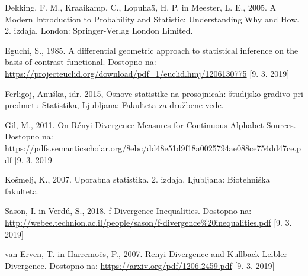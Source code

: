 \documentclass[a4paper, 12pt]{article}
\theoremstyle{definition}
\begin{document}
\begin{thebibliography}{9}
	
Dekking, F. M., Kraaikamp, C., Lopuha{\"a}, H. P. in Meester, L. E., 2005. A Modern Introduction to Probability and Statistic: Understanding Why and How. 2. izdaja. London: Springer-Verlag London Limited.

Eguchi, S., 1985. A differential geometric approach to statistical inference on the basis of contrast functional. Dostopno na: \url{https://projecteuclid.org/download/pdf_1/euclid.hmj/1206130775} [9. 3. 2019]

Ferligoj, Anu\v{s}ka, idr. 2015, Osnove statistike na prosojnicah: \v{s}tudijsko gradivo pri predmetu Statistika, Ljubljana: Fakulteta za dru\v{z}bene vede.

Gil, M., 2011. On Rényi Divergence Measures for Continuous Alphabet Sources. Dostopno na: 
\url{https://pdfs.semanticscholar.org/8ebc/dd48e51d9f18a0025794ae088ce754dd47ce.pdf} [9. 3. 2019]

Košmelj, K., 2007. Uporabna statistika. 2. izdaja. Ljubljana: Biotehniška fakulteta.

Sason, I. in Verd\'u, S., 2018. f-Divergence Inequalities. Dostopno na: \url{http://webee.technion.ac.il/people/sason/f-divergence%20inequalities.pdf} [9. 3. 2019]

van Erven, T. in Harremoës, P., 2007. Renyi Divergence and Kullback-Leibler Divergence. Dostopno na: 
\url{https://arxiv.org/pdf/1206.2459.pdf} [9. 3. 2019]

\end{thebibliography}
\end{document}
